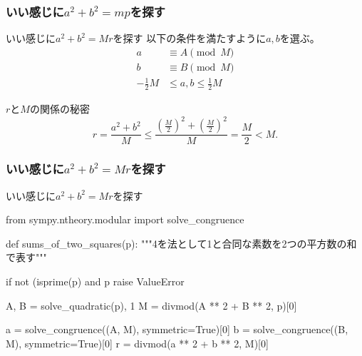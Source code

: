 \documentclass[dvipdfmx,11pt,notheorems]{beamer}
\theoremstyle{definition}
\begin{document}
\begin{frame}[fragile]\frametitle{いい感じに$a^{2}+b^{2}=mp$を探す}

\begin{block}{いい感じに$a^{2}+b^{2}=Mr$を探す}
以下の条件を満たすように$a, b$を選ぶ。
\begin{align*} 
a &\equiv A \pmod{M} \\ 
b &\equiv B \pmod{M} \\ 
-\frac{1}{2}M &\leq a, b \leq \frac{1}{2}M
\end{align*}
\end{block}

\begin{exampleblock}{$r$と$M$の関係の秘密}
\begin{equation*}
r = \frac{a^{2} + b^{2}}{M} \leq \frac{\left (\frac{M}{2} \right)^{2} + \left (\frac{M}{2} \right)^{2}}{M} = \frac{M}{2} < M.
\end{equation*}
\end{exampleblock}

\end{frame}

\begin{frame}[fragile]\frametitle{いい感じに$a^{2}+b^{2}=Mr$を探す}

\begin{block}{いい感じに$a^{2}+b^{2}=Mr$を探す}
\begin{pyverbatim}
from sympy.ntheory.modular import solve_congruence


def sums_of_two_squares(p):
    """4を法として1と合同な素数を2つの平方数の和で表す"""

    if not (isprime(p) and p %
        raise ValueError
                    
    A, B = solve_quadratic(p), 1
    M = divmod(A ** 2 + B ** 2, p)[0]

    a = solve_congruence((A, M), symmetric=True)[0]
    b = solve_congruence((B, M), symmetric=True)[0]
    r = divmod(a ** 2 + b ** 2, M)[0]
\end{pyverbatim}
\end{block}

\end{frame}
\end{document}
